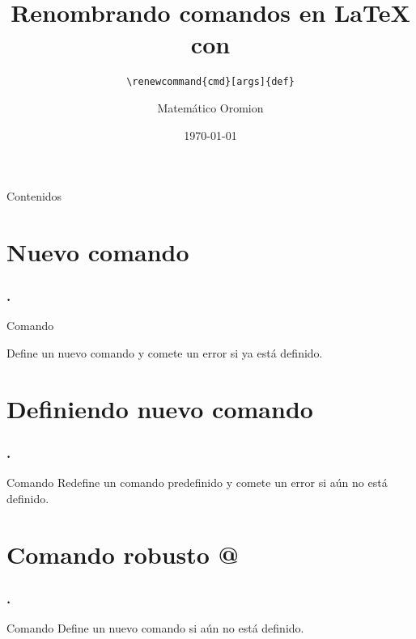 \documentclass[12pt]{beamer}
\begin{document}
	\author{Matemático Oromion}
	\title{Renombrando comandos en \LaTeX{} con}
	\cprotect\subtitle{\verb|\renewcommand{cmd}[args]{def}|}
	\logo{\LaTeX{}}
	\date{\today}
	\subject{Fin del curso}
	\begin{frame}[plain]
	\maketitle
\end{frame}


\begin{frame}{Contenidos}{}
\tableofcontents
\end{frame}
\section{Nuevo comando}
\begin{frame}
\frametitle{\thesection.}
\begin{examples}{Comando }

Define un nuevo comando y comete un error si ya está definido.
\end{examples}
\end{frame}
\section{Definiendo nuevo comando}


\begin{frame}
\frametitle{\thesection.}
\begin{block}{Comando }
Redefine un comando predefinido y comete un error si aún no está definido.
\end{block}
\end{frame}
\section{Comando robusto @}
\begin{frame}
\frametitle{\thesection.}
\begin{alertblock}{Comando }
Define un nuevo comando si aún no está definido.
\end{alertblock}
\end{frame}
\end{document}
